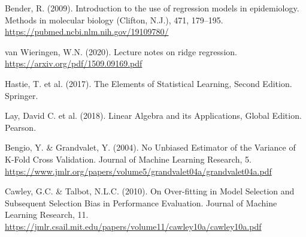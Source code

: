 \documentclass[a4paper,twocolumn]{article}
\begin{document}
\begin{thebibliography}{9}
Bender, R. (2009). Introduction to the use of regression models in epidemiology. Methods in molecular biology (Clifton, N.J.), 471, 179–195. \url{https://pubmed.ncbi.nlm.nih.gov/19109780/}

van Wieringen, W.N. (2020). Lecture notes on ridge regression. \url{https://arxiv.org/pdf/1509.09169.pdf}

Hastie, T. et al. (2017). The Elements of Statistical Learning, Second Edition. Springer. 

Lay, David C. et al. (2018). Linear Algebra and its Applications, Global Edition. Pearson. 

Bengio, Y. \& Grandvalet, Y. (2004). No Unbiased Estimator of the Variance of K-Fold Cross Validation. Journal of Machine Learning Research, 5. \url{https://www.jmlr.org/papers/volume5/grandvalet04a/grandvalet04a.pdf}

Cawley, G.C. \& Talbot, N.L.C. (2010). On Over-fitting in Model Selection and Subsequent Selection Bias in Performance Evaluation. Journal of Machine Learning Research, 11. \url{https://jmlr.csail.mit.edu/papers/volume11/cawley10a/cawley10a.pdf}
\end{thebibliography}
\newpage
\end{document}
